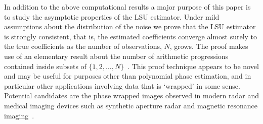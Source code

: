 \documentclass[journal]{IEEEtran}
\begin{document}
In addition to the above computational results a major purpose of this paper is to study the asymptotic properties of the LSU estimator.  Under mild assumptions about the distribution of the noise we prove that the LSU estimator is strongly consistent, that is, the estimated coefficients converge almost surely to the true coefficients as the number of observations, $N$, grows.  %
The proof makes use of an elementary result about the number of arithmetic progressions contained inside subsets of $\{1,2,\dots,N\}$~\cite{Erdos_on_some_sequence_of_integers1936,Szemeredi_setint_no_k_arth1975,Gowers_new_proof2001}.  %
This proof technique appears to be novel and may be useful for purposes other than polynomial phase estimation, and in particular other applications involving data that is `wrapped' in some sense.  Potential candidates are the phase wrapped images observed in modern radar and medical imaging devices such as synthetic aperture radar and magnetic resonance imaging~\cite{Katkovnik_phasela_2009, Nico_phaseunwrappingSAR_2000,Friedlander_PD_phaseunwrapping_1996}.  
\end{document}
